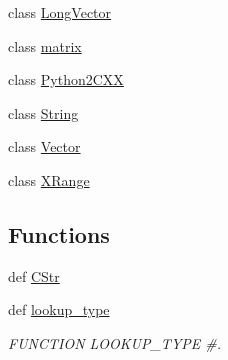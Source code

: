 \begin{DoxyCompactItemize}
class \hyperlink{classscipy_1_1weave_1_1accelerate__tools_1_1LongVector}{Long\+Vector}
\item 
class \hyperlink{classscipy_1_1weave_1_1accelerate__tools_1_1matrix}{matrix}
\item 
class \hyperlink{classscipy_1_1weave_1_1accelerate__tools_1_1Python2CXX}{Python2\+C\+X\+X}
\item 
class \hyperlink{classscipy_1_1weave_1_1accelerate__tools_1_1String}{String}
\item 
class \hyperlink{classscipy_1_1weave_1_1accelerate__tools_1_1Vector}{Vector}
\item 
class \hyperlink{classscipy_1_1weave_1_1accelerate__tools_1_1XRange}{X\+Range}
\end{DoxyCompactItemize}
\subsection*{Functions}
\begin{DoxyCompactItemize}
\item 
def \hyperlink{namespacescipy_1_1weave_1_1accelerate__tools_a4287c2136df8bf55083220e7fea5e915}{C\+Str}
\item 
def \hyperlink{namespacescipy_1_1weave_1_1accelerate__tools_ac6b2be3bb26069146cf65369992d42e6}{lookup\+\_\+type}
\begin{DoxyCompactList}\small\item\em F\+U\+N\+C\+T\+I\+O\+N L\+O\+O\+K\+U\+P\+\_\+\+T\+Y\+P\+E \#. \end{DoxyCompactList}\end{DoxyCompactItemize}
